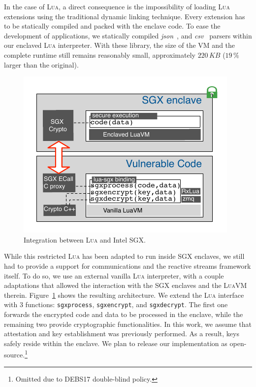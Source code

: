 In the case of \textsc{Lua}, a direct consequence is the impossibility of loading \textsc{Lua} extensions using the traditional dynamic linking technique. 
Every extension has to be statically compiled and packed with the enclave code. 
To ease the development of \SYS applications, we statically compiled \emph{json}~\cite{rfc7159}, and \emph{csv}~\cite{rfc4180} parsers within our enclaved \textsc{Lua} interpreter.
With these library, the size of the VM and the complete runtime still remains reasonably small, approximately $220\,KB$ ($19\,\%$ larger than the original).

\begin{figure}[t!]
  \centering
  \includegraphics[width=.9\linewidth]{images/arch-sgxlua}
  \caption{Integration between \textsc{Lua} and Intel SGX.}
  \label{fig:arch-luasgx}
\end{figure}

While this restricted \textsc{Lua} has been adapted to run inside SGX enclaves, we still had to provide a support for communications and the reactive streams framework itself.
To do so, we use an external vanilla \textsc{Lua} interpreter, with a couple adaptations that allowed the interaction with the SGX enclaves and the \textsc{LuaVM} therein.
Figure~\ref{fig:arch-luasgx} shows the resulting architecture.
We extend the \textsc{Lua} interface with 3 functions: \texttt{sgxprocess}, \texttt{sgxencrypt}, and \texttt{sgxdecrypt}. 
The first one forwards the encrypted code and data to be processed in the enclave, while the remaining two provide cryptographic functionalities.
In this work, we assume that attestation and key establishment was previously performed.
As a result, keys safely reside within the enclave.
We plan to release our implementation as open-source.\footnote{Omitted due to DEBS17 double-blind policy.}
